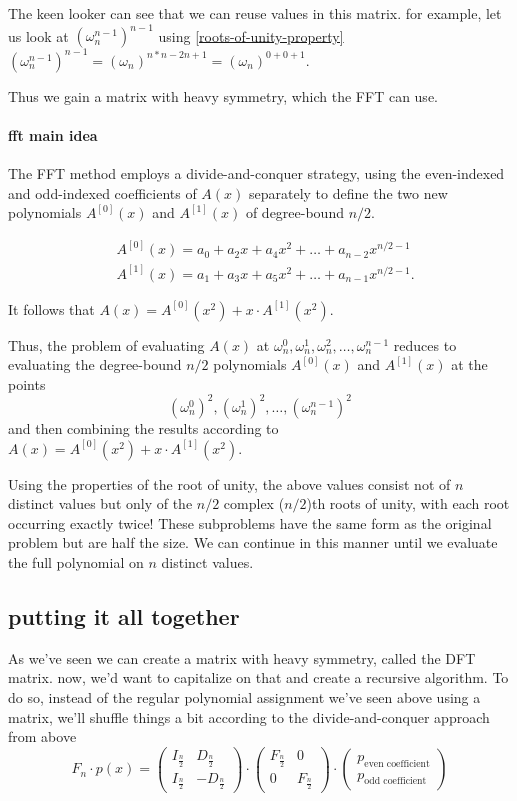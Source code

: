  The keen looker can see that we can reuse values in this matrix.
 for example, let us look at $(\omega_n^{n-1})^{n-1}$ using \ref{roots-of-unity-property}
 $(\omega_n^{n-1})^{n-1} = (\omega_n)^{n*n-2n+1}=(\omega_n)^{0+0+1}$.  

 Thus we gain a matrix with heavy symmetry, which the FFT can use.

\paragraph{fft main idea}
The FFT method employs a divide-and-conquer strategy, 
using the even-indexed and odd-indexed coefficients of $A(x)$
separately to define the two new polynomials $A^{[0]}(x)$ and $A^{[1]}(x)$ of degree-bound $n/2$.

\begin{align}
  &A^{[0]}(x) =  a_0 +a_2x + a_4x^2 + \dots + a_{n-2}x^{n/2-1}\\
  &A^{[1]}(x) =  a_1 +a_3x + a_5x^2 + \dots + a_{n-1}x^{n/2-1}.
\end{align}


It follows that $A(x)=A^{[0]}(x^2) + x\cdot A^{[1]}(x^2)$.

Thus, the problem of evaluating $A(x)$ at 
$\omega_n^0, \omega_n^1, \omega_n^2,\dots, \omega_n^{n-1}$ 
reduces to evaluating the degree-bound $n/2$ polynomials  $A^{[0]}(x)$ and $A^{[1]}(x)$ at the points
$$(\omega_n^0)^2, (\omega_n^1)^2,\dots, (\omega_n^{n-1})^2$$
and then combining the results according to $A(x)=A^{[0]}(x^2) + x\cdot A^{[1]}(x^2)$.


Using the properties of the root of unity, 
the above values consist not of $n$ distinct values but only of the $n/2$
 complex ($n/2$)th roots of unity, with each root occurring exactly twice!
These subproblems have the same form as the original problem but are half the size.
We can continue in this manner until we evaluate the full polynomial on $n$ distinct values.


\subsection{putting it all together}
As we've seen we can create a matrix with heavy symmetry, called the DFT matrix. 
now, we'd want to capitalize on that and create a recursive algorithm.
To do so, instead of the regular polynomial assignment we've seen above using a matrix,  
we'll shuffle things a bit according to the divide-and-conquer approach from above
$$
F_n \cdot p(x) = 
\begin{pmatrix}
  I_{ \frac{n}{2}} & D_{\frac{n}{2}} \\
  I_{ \frac{n}{2}} & -D_{\frac{n}{2}}
 \end{pmatrix}
 \cdot 
 \begin{pmatrix}
  F_{ \frac{n}{2}} & 0 \\
  0 & F_{ \frac{n}{2}} 
\end{pmatrix}
\cdot 
\begin{pmatrix}
  p_{\text{even coefficient}} \\
  p_{\text{odd coefficient}}
\end{pmatrix}
 $$

